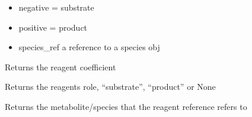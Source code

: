\documentclass[letterpaper,10pt,english]{sphinxmanual}
\begin{document}
\begin{fulllineitems}
\label{\detokenize{modules_doc:cbmpy.CBModel.Reagent}}
\pysigstartsignatures
{}
\pysigstopsignatures\begin{description}
\begin{itemize}
\item {} 
\sphinxAtStartPar
negative = substrate

\item {} 
\sphinxAtStartPar
positive = product

\item {} 
\sphinxAtStartPar
species\_ref a reference to a species obj

\end{itemize}

\end{description}

\begin{fulllineitems}
\label{\detokenize{modules_doc:cbmpy.CBModel.Reagent.getCoefficient}}
\pysigstartsignatures
{}
\pysigstopsignatures
\sphinxAtStartPar
Returns the reagent coefficient

\end{fulllineitems}


\begin{fulllineitems}
\label{\detokenize{modules_doc:cbmpy.CBModel.Reagent.getRole}}
\pysigstartsignatures
{}
\pysigstopsignatures
\sphinxAtStartPar
Returns the reagents role, “substrate”, “product” or None

\end{fulllineitems}


\begin{fulllineitems}
\label{\detokenize{modules_doc:cbmpy.CBModel.Reagent.getSpecies}}
\pysigstartsignatures
{}
\pysigstopsignatures
\sphinxAtStartPar
Returns the metabolite/species that the reagent reference refers to


\end{fulllineitems}
\end{fulllineitems}
\end{document}
